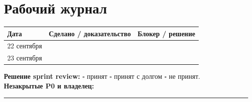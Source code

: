 \documentclass[11pt,a4paper]{article}
\begin{document}
\section{Рабочий журнал}
\begin{tabularx}{\textwidth}{p{25mm}X X}
\toprule
Дата & Сделано / доказательство & Блокер / решение\\
\midrule
22 сентября & \rule{0pt}{11mm} & \\
23 сентября & \rule{0pt}{11mm} & \\
\bottomrule
\end{tabularx}
\vspace{4mm}
\begin{goalbox}
\textbf{Решение sprint review:} $\square$ принят \quad $\square$ принят с долгом \quad $\square$ не принят.\\[2mm]
\textbf{Незакрытые P0 и владелец:} \rule{105mm}{0.4pt}
\end{goalbox}
\end{document}
